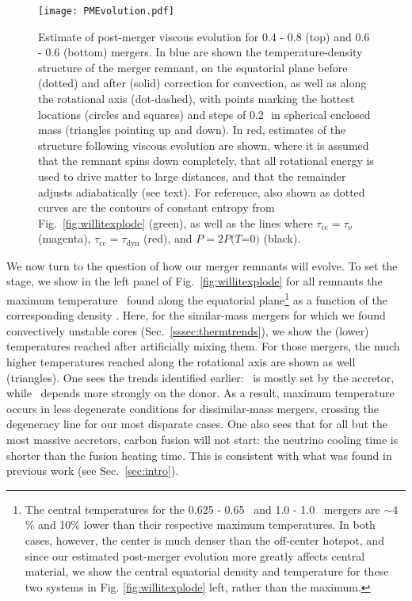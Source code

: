 
\begin{figure}
\centering
\texttt{[image: PMEvolution.pdf]}
\caption{Estimate of post-merger viscous evolution for 0.4 - 0.8 {\Msun} (top) and 0.6 - 0.6 {\Msun} (bottom) mergers.  In blue are shown the temperature-density structure of the merger remnant, on the equatorial plane before (dotted) and after (solid) correction for convection, as well as along the rotational axis (dot-dashed), with points marking the hottest locations (circles and squares) and steps of 0.2\,\Msun\ in spherical enclosed mass (triangles pointing up and down).  In red, estimates of the structure following viscous evolution are shown, where it is assumed that the remnant spins down completely, that all rotational energy is used to drive matter to large distances, and that the remainder adjusts adiabatically (see text).  For reference, also shown as dotted curves are the contours of constant entropy from Fig.~\ref{fig:willitexplode} (green), as well as the lines where $\tau_\mathrm{cc} = \tau_\mathrm{\nu}$ (magenta), $\tau_\mathrm{cc} = \tau_\mathrm{dyn}$ (red), and $P = 2P(T$=$0)$ (black).}
\label{fig:pmevolution}
\end{figure}

We now turn to the question of how our merger remnants will evolve.  To set the stage, we show in the left panel of Fig.~\ref{fig:willitexplode} for all remnants the maximum temperature \Tmax\ found along the equatorial plane\footnote{The central temperatures for the 0.625 - 0.65 \Msun\ and 1.0 - 1.0 \Msun\ mergers are $\sim\!4$\% and 10\% lower than their respective maximum temperatures.  In both cases, however, the center is much denser than the off-center hotspot, and since our estimated post-merger evolution more greatly affects central material, we show the central equatorial density and temperature for these two systems in Fig. \ref{fig:willitexplode} left, rather than the maximum.} as a function of the corresponding density \rhoTmax.  Here, for the similar-mass mergers for which we found convectively unstable cores (Sec.~\ref{sssec:thermtrends}), we show the (lower) temperatures reached after artificially mixing them.   For those mergers, the much higher temperatures reached along the rotational axis are shown as well (triangles).  One sees the trends identified earlier: \Tmax\ is mostly set by the accretor, while \rhoTmax\ depends more strongly on the donor.  As a result, maximum temperature occurs in less degenerate conditions for dissimilar-mass mergers, crossing the degeneracy line for our most disparate cases.  One also sees that for all but the most massive accretors, carbon fusion will not start: the neutrino cooling time is shorter than the fusion heating time.  This is consistent with what was found in previous work (see Sec.~\ref{sec:intro}).

